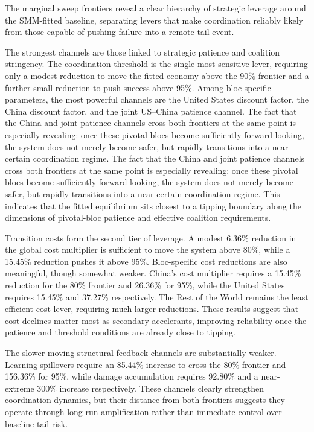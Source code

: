\documentclass[12pt,a4paper]{article}
\begin{document}
The marginal sweep frontiers reveal a clear hierarchy of strategic leverage around the SMM-fitted baseline, separating levers that make coordination reliably likely from those capable of pushing failure into a remote tail event.

The strongest channels are those linked to strategic patience and coalition stringency. The coordination threshold is the single most sensitive lever, requiring only a modest reduction to move the fitted economy above the 90\% frontier and a further small reduction to push success above 95\%. Among bloc-specific parameters, the most powerful channels are the United States discount factor, the China discount factor, and the joint US--China patience channel. The fact that the China and joint patience channels cross both frontiers at the same point is especially revealing: once these pivotal blocs become sufficiently forward-looking, the system does not merely become safer, but rapidly transitions into a near-certain coordination regime. The fact that the China and joint patience channels cross both frontiers at the same point is especially revealing: once these pivotal blocs become sufficiently forward-looking, the system does not merely become safer, but rapidly transitions into a near-certain coordination regime. This indicates that the fitted equilibrium sits closest to a tipping boundary along the dimensions of pivotal-bloc patience and effective coalition requirements.

Transition costs form the second tier of leverage. A modest 6.36\% reduction in the global cost multiplier is sufficient to move the system above 80\%, while a 15.45\% reduction pushes it above 95\%. Bloc-specific cost reductions are also meaningful, though somewhat weaker. China's cost multiplier requires a 15.45\% reduction for the 80\% frontier and 26.36\% for 95\%, while the United States requires 15.45\% and 37.27\% respectively. The Rest of the World remains the least efficient cost lever, requiring much larger reductions. These results suggest that cost declines matter most as secondary accelerants, improving reliability once the patience and threshold conditions are already close to tipping.

The slower-moving structural feedback channels are substantially weaker. Learning spillovers require an 85.44\% increase to cross the 80\% frontier and 156.36\% for 95\%, while damage accumulation requires 92.80\% and a near-extreme 300\% increase respectively. These channels clearly strengthen coordination dynamics, but their distance from both frontiers suggests they operate through long-run amplification rather than immediate control over baseline tail risk.
\end{document}
